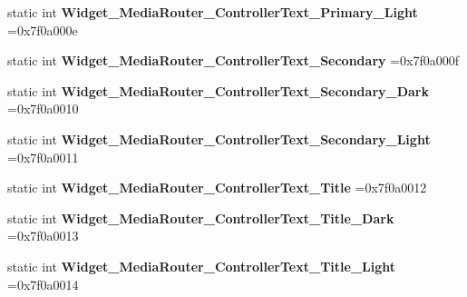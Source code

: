 \begin{DoxyCompactItemize}
\item 
\mbox{\label{classandroid_1_1support_1_1v7_1_1mediarouter_1_1R_1_1style_abcb07d650b2bad14fde9a04913e46b58}} 
static int {\bfseries Widget\+\_\+\+Media\+Router\+\_\+\+Controller\+Text\+\_\+\+Primary\+\_\+\+Light} =0x7f0a000e
\item 
\mbox{\label{classandroid_1_1support_1_1v7_1_1mediarouter_1_1R_1_1style_a62d715b8091a0eb605c2072f9a1fd5a4}} 
static int {\bfseries Widget\+\_\+\+Media\+Router\+\_\+\+Controller\+Text\+\_\+\+Secondary} =0x7f0a000f
\item 
\mbox{\label{classandroid_1_1support_1_1v7_1_1mediarouter_1_1R_1_1style_ab57334d359bb40512c95e00155ee3675}} 
static int {\bfseries Widget\+\_\+\+Media\+Router\+\_\+\+Controller\+Text\+\_\+\+Secondary\+\_\+\+Dark} =0x7f0a0010
\item 
\mbox{\label{classandroid_1_1support_1_1v7_1_1mediarouter_1_1R_1_1style_ac947ee7ca41572dd7e8e9e6c3c115ec5}} 
static int {\bfseries Widget\+\_\+\+Media\+Router\+\_\+\+Controller\+Text\+\_\+\+Secondary\+\_\+\+Light} =0x7f0a0011
\item 
\mbox{\label{classandroid_1_1support_1_1v7_1_1mediarouter_1_1R_1_1style_a3e889255a592dc0554674f242c9acdbd}} 
static int {\bfseries Widget\+\_\+\+Media\+Router\+\_\+\+Controller\+Text\+\_\+\+Title} =0x7f0a0012
\item 
\mbox{\label{classandroid_1_1support_1_1v7_1_1mediarouter_1_1R_1_1style_a77f044a587d5af6cf646d5d60bb112f7}} 
static int {\bfseries Widget\+\_\+\+Media\+Router\+\_\+\+Controller\+Text\+\_\+\+Title\+\_\+\+Dark} =0x7f0a0013
\item 
\mbox{\label{classandroid_1_1support_1_1v7_1_1mediarouter_1_1R_1_1style_ae7f20ff8d432dd188825c3c253426603}} 
static int {\bfseries Widget\+\_\+\+Media\+Router\+\_\+\+Controller\+Text\+\_\+\+Title\+\_\+\+Light} =0x7f0a0014

\end{DoxyCompactItemize}
